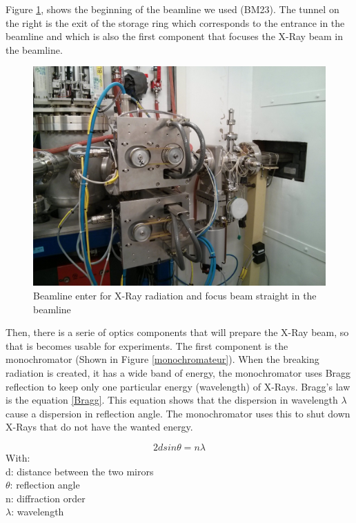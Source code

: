 \documentclass[11pt,a4paper,oneside]{report}
\begin{document}
Figure \ref{Incident}, shows the beginning of the beamline we used (BM23). The tunnel on the right is the exit of the  storage ring which corresponds to the entrance in the beamline and which is also the first component that focuses the X-Ray beam in the beamline.

\begin{figure}[H]
    \begin{center}
        \includegraphics[scale=0.13]{Images/IMG_20151210_202655.jpg}
        \caption{Beamline enter for X-Ray radiation and focus beam straight in the beamline}
        \label{Incident}
    \end{center}
\end{figure}


Then, there is a serie of optics components that will prepare the X-Ray beam, so that is becomes usable for experiments. The first component is the monochromator (Shown in Figure \ref{monochromateur}). When the breaking radiation is created, it has a wide band of energy, the monochromator uses Bragg reflection to keep only one particular energy (wavelength) of X-Rays. Bragg's law is the equation \ref{Bragg}. This equation shows that the dispersion in wavelength $\lambda$ cause a dispersion in reflection angle. The monochromator uses this to shut down X-Rays that do not have the wanted energy.

\begin{equation}
    2d sin \theta = n \lambda  \label{Bragg}
\end{equation}
With:\\
d: distance between the two mirors\\
$\theta$: reflection angle\\
n: diffraction order\\
$\lambda$: wavelength\\
\end{document}
